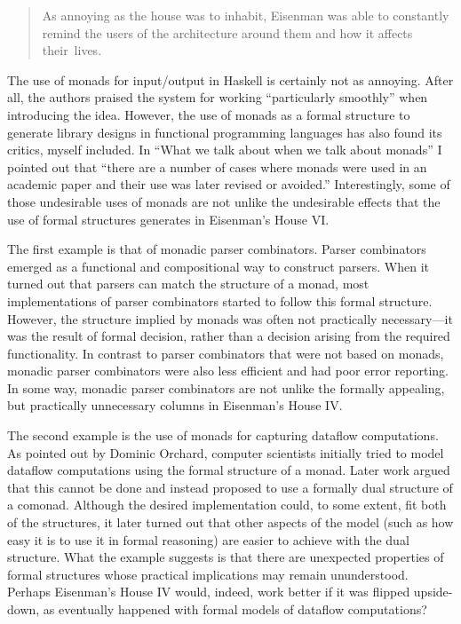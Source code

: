 \begin{quote}
As annoying as the house was to inhabit, Eisenman was able to constantly
remind the users of the architecture around them and how it affects
their~lives.
\end{quote}

The use of monads for input/output in Haskell is certainly not as annoying. After all, the
authors praised the system for working ``particularly smoothly'' when introducing the idea.
However, the use of monads as a formal structure to generate library designs in functional
programming languages has also found its critics, myself included. In ``What we talk about when we
talk about monads'' I pointed out that ``there are a number of cases where monads
were used in an academic paper and their use was later revised or avoided.''
Interestingly, some of those undesirable uses of monads are not unlike the undesirable effects
that the use of formal structures generates in Eisenman's House VI.

The first example is that of monadic parser combinators. Parser combinators
emerged as a functional and compositional way to construct parsers. When it turned out that
parsers can match the structure of a monad, most implementations of parser combinators
started to follow this formal structure. However, the structure implied by monads was often
not practically necessary---it was the result of formal decision, rather than a decision
arising from the required functionality. In contrast to parser combinators that were not based
on monads, monadic parser combinators were also less efficient and had poor error reporting.
In some way, monadic parser combinators are not unlike the formally appealing, but practically
unnecessary columns in Eisenman's House IV.

The second example is the use of monads for capturing dataflow computations. As pointed out
by Dominic Orchard, computer scientists initially tried to model dataflow
computations using the formal structure of a monad. Later work argued that this cannot be done
and instead proposed to use a formally dual structure of a comonad. Although the desired
implementation could, to some extent, fit both of the structures, it later turned out that
other aspects of the model (such as how easy it is to use it in formal reasoning) are
easier to achieve with the dual structure. What the example suggests is that there are
unexpected properties of formal structures whose practical implications may remain
ununderstood. Perhaps Eisenman's House IV would, indeed, work better if it was flipped upside-down,
as eventually happened with formal models of dataflow computations?

